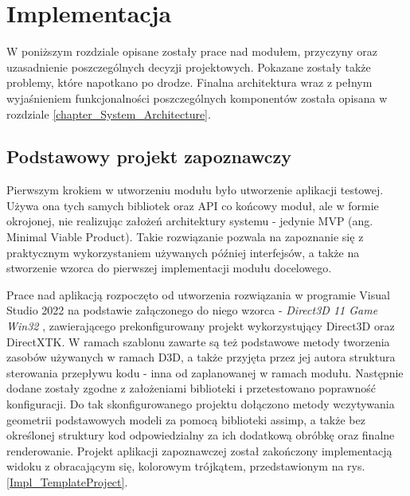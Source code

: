 \chapter{Implementacja}
W poniższym rozdziale opisane zostały prace nad modułem, przyczyny oraz uzasadnienie poszczególnych decyzji projektowych. Pokazane zostały także problemy, które napotkano po drodze. Finalna architektura wraz z pełnym wyjaśnieniem funkcjonalności poszczególnych komponentów została opisana w rozdziale \ref{chapter_System_Architecture}.

\section{Podstawowy projekt zapoznawczy}
Pierwszym krokiem w utworzeniu modułu było utworzenie aplikacji testowej. Używa ona tych samych bibliotek oraz API co końcowy moduł, ale w formie okrojonej, nie realizując założeń architektury systemu - jedynie MVP (ang. Minimal Viable Product). Takie rozwiązanie pozwala na zapoznanie się z praktycznym wykorzystaniem używanych później interfejsów, a także na stworzenie wzorca do pierwszej implementacji modułu docelowego.

Prace nad aplikacją rozpoczęto od utworzenia rozwiązania w programie Visual Studio 2022 na podstawie załączonego do niego wzorca - \textit{Direct3D 11 Game Win32} \cite{GitHub:walbourn:directx-vs-templates}, zawierającego prekonfigurowany projekt wykorzystujący Direct3D oraz DirectXTK. W ramach szablonu zawarte są też podstawowe metody tworzenia zasobów używanych w ramach D3D, a także przyjęta przez jej autora struktura sterowania przepływu kodu - inna od zaplanowanej w ramach modułu. Następnie dodane zostały zgodne z założeniami biblioteki i przetestowano poprawność konfiguracji. Do tak skonfigurowanego projektu dołączono metody wczytywania geometrii podstawowych modeli za pomocą biblioteki assimp, a także bez określonej struktury kod odpowiedzialny za ich dodatkową obróbkę oraz finalne renderowanie. Projekt aplikacji zapoznawczej został zakończony implementacją widoku z obracającym się, kolorowym trójkątem, przedstawionym na rys. \ref{Impl_TemplateProject}.

\vfill
\clearpage

